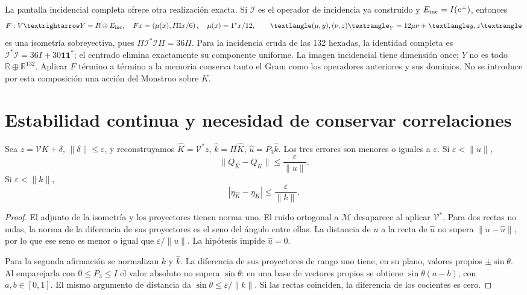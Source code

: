 La pantalla incidencial completa ofrece otra realización exacta. Si
\(\mathcal I\) es el operador de incidencia ya construido y
\(E_{\rm inc}=\mathcal I(e^\perp)\), entonces
\begin{equation}
 F:V\longrightarrow Y=\mathbb R\oplus E_{\rm inc},\quad
 Fx=\left(\mu(x),\frac{\mathcal I\Pi x}{6}\right),\quad
 \mu(x)=\frac{\mathbf1^*x}{12},\qquad
 \langle(\mu,y),(\nu,z)\rangle_Y=12\mu\nu+\langle y,z\rangle
 \label{x_reciprocidad:lib01:incidencia-F}
\end{equation}
es una isometría sobreyectiva, pues
\(\Pi\mathcal I^*\mathcal I\Pi=36\Pi\). Para la incidencia
cruda de las 132 hexadas, la identidad completa es
\(\mathcal I^*\mathcal I=36I+30\mathbf1\mathbf1^*\); el
centrado elimina exactamente su componente uniforme. La imagen incidencial tiene
dimensión once; \(Y\) no es todo \(\mathbb R\oplus\mathbb R^{132}\).
Aplicar \(F\) término a término a la memoria conserva tanto el Gram
como los operadores anteriores y sus dominios. No se introduce por esta
composición una acción del Monstruo sobre \(K\).

\section{Estabilidad continua y necesidad de conservar correlaciones}
\label{x_reciprocidad:lib01:ruido}

\begin{theorem}
\label{x_reciprocidad:lib01:error-proyectores}
Sea \(z=\mathcal VK+\delta\), \(\|\delta\|\leq\varepsilon\),
y reconstruyamos
\(\widehat K=\mathcal V^*z\), \(\widehat k=\Pi\widehat K\),
\(\widehat u=P_3\widehat k\). Los tres errores son menores o iguales
a \(\varepsilon\). Si \(\varepsilon<\|u\|\),
\[
 \|Q_{\widehat K}-Q_K\|\leq\frac\varepsilon{\|u\|}.
\]
Si \(\varepsilon<\|k\|\),
\[
 |\eta_{\widehat K}-\eta_K|\leq\frac\varepsilon{\|k\|}.
\]
\end{theorem}
\begin{proof}
El adjunto de la isometría y los proyectores tienen norma uno. El ruido
ortogonal a \(\mathcal M\) desaparece al aplicar \(\mathcal V^*\).
Para dos rectas no nulas, la norma de la diferencia de sus proyectores es
el seno del ángulo entre ellas. La distancia de \(u\) a la recta de
\(\widehat u\) no supera \(\|u-\widehat u\|\), por lo que ese
seno es menor o igual que \(\varepsilon/\|u\|\). La hipótesis
impide \(\widehat u=0\).

Para la segunda afirmación se normalizan \(k\) y \(\widehat k\).
La diferencia de sus proyectores de rango uno tiene, en su plano, valores
propios \(\pm\sin\theta\). Al emparejarla con \(0\leq P_3\leq I\)
el valor absoluto no supera \(\sin\theta\): en una base de vectores
propios se obtiene \(\sin\theta(a-b)\), con \(a,b\in[0,1]\).
El mismo argumento de distancia da
\(\sin\theta\leq\varepsilon/\|k\|\). Si las rectas coinciden,
la diferencia de los cocientes es cero.
\end{proof}

